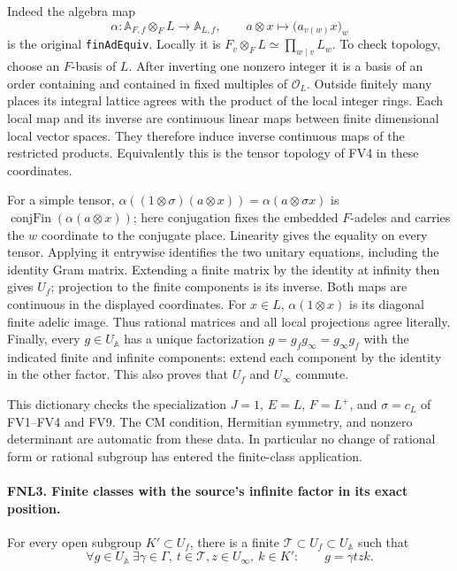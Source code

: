 Indeed the algebra map
\[
 \alpha:\mathbb A_{F,f}\otimes_F L\longrightarrow\mathbb A_{L,f},
 \qquad a\otimes x\longmapsto \bigl(a_{v(w)}x\bigr)_w
\]
is the original \texttt{finAdEquiv}.  Locally it is
\(F_v\otimes_F L\simeq\prod_{w\mid v}L_w\).
To check topology, choose an \(F\)-basis of \(L\).  After inverting
one nonzero integer it is a basis of an order containing and contained
in fixed multiples of \(\mathcal O_L\).  Outside finitely many places
its integral lattice agrees with the product of the local integer
rings.  Each local map and its inverse are continuous linear maps
between finite dimensional local vector spaces.  They therefore induce
inverse continuous maps of the restricted products.  Equivalently this
is the tensor topology of FV4 in these coordinates.

For a simple tensor,
\(\alpha((1\otimes\sigma)(a\otimes x))=\alpha(a\otimes\sigma x)\)
is \(\operatorname{conjFin}(\alpha(a\otimes x))\); here conjugation
fixes the embedded \(F\)-adeles and carries the \(w\) coordinate to
the conjugate place.  Linearity gives the equality on every tensor.
Applying it entrywise identifies the two unitary equations, including
the identity Gram matrix.  Extending a finite matrix by the identity
at infinity then gives \(U_f\); projection to the finite components
is its inverse.  Both maps are continuous in the displayed coordinates.
For \(x\in L\), \(\alpha(1\otimes x)\) is its diagonal finite
adelic image.  Thus rational matrices and all local projections agree
literally.  Finally, every \(g\in U_{\mathbb A}\) has a unique
factorization \(g=g_f g_\infty=g_\infty g_f\) with the indicated
finite and infinite components: extend each component by the identity
in the other factor.  This also proves that \(U_f\) and \(U_\infty\)
commute.

This dictionary checks the specialization \(J=1\), \(E=L\),
\(F=L^+\), and \(\sigma=c_L\) of FV1--FV4 and FV9.  The CM condition,
Hermitian symmetry, and nonzero determinant are automatic from these
data.  In particular no change of rational form or rational subgroup
has entered the finite-class application.

\paragraph{FNL3. Finite classes with the source's infinite factor in its exact position.}
\label{claim:FNL3}
For every open subgroup \(K'\subset U_f\), there is a finite
\(\mathcal T\subset U_f\subset U_{\mathbb A}\) such that
\begin{equation}\label{eq:fnl-class}
 \forall g\in U_{\mathbb A}\ \exists\gamma\in\Gamma,\ t\in\mathcal T,
 z\in U_\infty,\ k\in K':\qquad g=\gamma t z k.
\end{equation}

